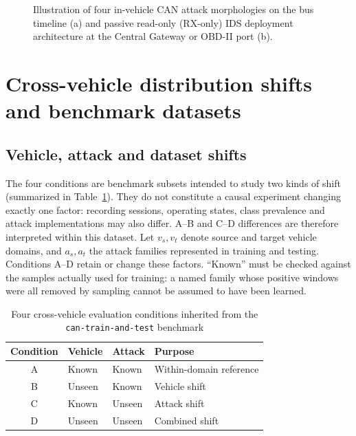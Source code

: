 \documentclass[12pt, a4paper, reqno, oneside]{book}
\begin{document}
\begin{figure}[htbp]
\caption[Four CAN attack morphologies and passive IDS architecture]{Illustration of four in-vehicle CAN attack morphologies on the bus timeline (a) and passive read-only (RX-only) IDS deployment architecture at the Central Gateway or OBD-II port (b).}\label{fig:attack-passive-ids}
\end{figure}

\section{Cross-vehicle distribution shifts and benchmark datasets}
\subsection{Vehicle, attack and dataset shifts}
The four conditions are benchmark subsets intended to study two kinds of shift (summarized in Table~\ref{tab:conditions}). They do not constitute a causal experiment changing exactly one factor: recording sessions, operating states, class prevalence and attack implementations may also differ. A--B and C--D differences are therefore interpreted within this dataset.
Let $v_s,v_t$ denote source and target vehicle domains, and $a_s,a_t$ the attack families represented in training and testing. Conditions A--D retain or change these factors. ``Known'' must be checked against the samples actually used for training: a named family whose positive windows were all removed by sampling cannot be assumed to have been learned.

\begin{table}[htbp]\centering\footnotesize
\caption[Four cross-vehicle evaluation conditions]{Four cross-vehicle evaluation conditions inherited from the \texttt{can-train-and-test} benchmark}\label{tab:conditions}
\begin{tabular}{clll}\toprule Condition & Vehicle & Attack & Purpose\\\midrule
A & Known & Known & Within-domain reference\\
B & Unseen & Known & Vehicle shift\\
C & Known & Unseen & Attack shift\\
D & Unseen & Unseen & Combined shift\\\bottomrule\end{tabular}
\end{table}
\end{document}
